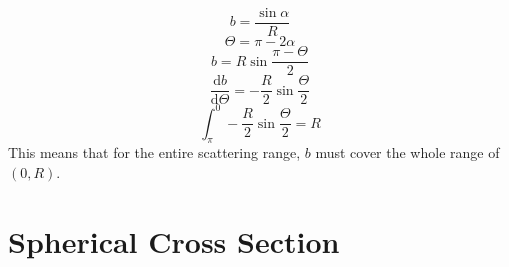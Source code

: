 \documentclass[12pt]{article}
\begin{document}
\begin{equation}
b=\frac{\sin{\alpha}}{R}
\end{equation}
\begin{equation}
  \Theta=\pi-2\alpha
\end{equation}
\begin{equation}
  b=R\sin{\frac{\pi-\Theta}{2}}
\end{equation}
\begin{equation}
  \frac{\textrm{d}{b}}{\textrm{d}{\Theta}}=-\frac{R}{2}\sin{\frac{\Theta}{2}}
\end{equation}
\begin{equation}
  \int_\pi^0-\frac{R}{2}\sin{\frac{\Theta}{2}}=R
\end{equation}
This means that for the entire scattering range, $b$ must cover the whole range of $(0,R)$.

\section{Spherical Cross Section}
\end{document}
